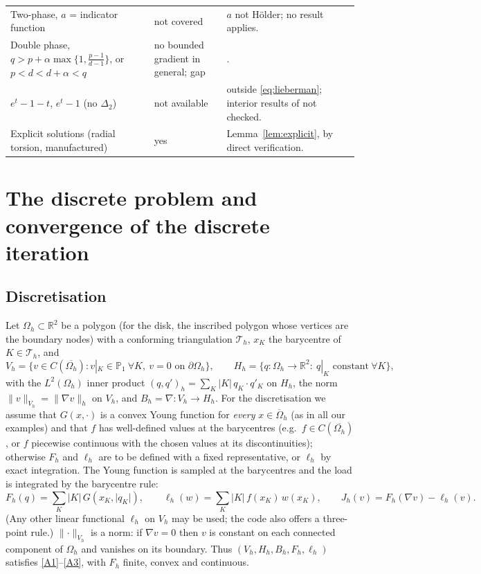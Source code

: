 \documentclass[11pt]{amsart}
\theoremstyle{definition}
\theoremstyle{remark}
\numberwithin{equation}{section}
\newcommand{\R}{\mathbb{R}}
\newcommand{\abs}[1]{\lvert #1\rvert}
\newcommand{\norm}[1]{\lVert #1\rVert}
\begin{document}
\begin{table}[t]
\begin{tabular}{@{}>{\raggedright\arraybackslash}p{4.6cm}>{\raggedright\arraybackslash}p{2.2cm}>{\raggedright\arraybackslash}p{7.4cm}@{}}
Two-phase, $a$ = indicator function & not covered & $a$ not H\"older; no result applies.\\
Double phase, $q>p+\alpha\max\{1,\frac{p-1}{d-1}\}$, or $p<d<d+\alpha<q$ & no bounded gradient in general; gap & \cite{BDS2020,ELM2004,FMM2004,Zhikov1995}.\\
$e^t-1-t$, $e^t-1$ (no $\Delta_2$) & not available & outside \eqref{eq:lieberman}; interior results of \cite{DeFilippisMingione2021} not checked.\\
Explicit solutions (radial torsion, manufactured) & yes & Lemma~\ref{lem:explicit}, by direct verification.\\
\bottomrule
\end{tabular}
\end{table}

\section{The discrete problem and convergence of the discrete iteration}\label{sec:discrete}

\subsection{Discretisation}\label{ssec:discretisation}
Let $\Omega_h\subset\R^2$ be a polygon (for the disk, the inscribed polygon whose vertices are the boundary nodes) with a conforming triangulation $\mathcal T_h$, $x_K$ the barycentre of $K\in\mathcal T_h$, and
\[
V_h=\{v\in C(\overline{\Omega_h}):v|_K\in\mathbb P_1\ \forall K,\ v=0\text{ on }\partial\Omega_h\},\qquad
H_h=\{q\colon\Omega_h\to\R^2:\ q|_K\text{ constant}\ \forall K\},
\]
with the $L^2(\Omega_h)$ inner product $(q,q')_h=\sum_K\abs K\,q_K\cdot q'_K$ on $H_h$, the norm $\norm{v}_{V_h}=\norm{\nabla v}_h$ on $V_h$, and $B_h=\nabla\colon V_h\to H_h$. For the discretisation we assume that $G(x,\cdot)$ is a convex Young function for \emph{every} $x\in\overline\Omega_h$ (as in all our examples) and that $f$ has well-defined values at the barycentres (e.g.\ $f\in C(\overline{\Omega_h})$, or $f$ piecewise continuous with the chosen values at its discontinuities); otherwise $F_h$ and $\ell_h$ are to be defined with a fixed representative, or $\ell_h$ by exact integration. The Young function is sampled at the barycentres and the load is integrated by the barycentre rule:
\[
F_h(q)=\sum_{K}\abs K\,G(x_K,\abs{q_K}),\qquad \ell_h(w)=\sum_K\abs K\,f(x_K)\,w(x_K),\qquad J_h(v)=F_h(\nabla v)-\ell_h(v).
\]
(Any other linear functional $\ell_h$ on $V_h$ may be used; the code also offers a three-point rule.) $\norm\cdot_{V_h}$ is a norm: if $\nabla v=0$ then $v$ is constant on each connected component of $\Omega_h$ and vanishes on its boundary. Thus $(V_h,H_h,B_h,F_h,\ell_h)$ satisfies \ref{A1}--\ref{A3}, with $F_h$ finite, convex and continuous.
\end{document}
